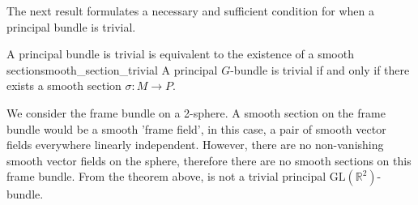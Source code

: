 The next result formulates a necessary and sufficient condition for when a principal bundle is trivial.
\begin{theorem}{A principal bundle is trivial is equivalent to the existence of a smooth section}{smooth_section_trivial}
    A principal \(G\)-bundle  is trivial if and only if there exists a smooth section \(\sigma : M \to P\).
\end{theorem}
\begin{example}
    We consider the frame bundle on a 2-sphere. A smooth section on the frame bundle would be a smooth 'frame field', in this case, a pair of smooth vector fields everywhere linearly independent. However, there are no non-vanishing smooth vector fields on the sphere, therefore there are no smooth sections on this frame bundle. From the theorem above,  is not a trivial principal \(\mathrm{GL}(\mathbb{R}^2)\)-bundle.
\end{example}
